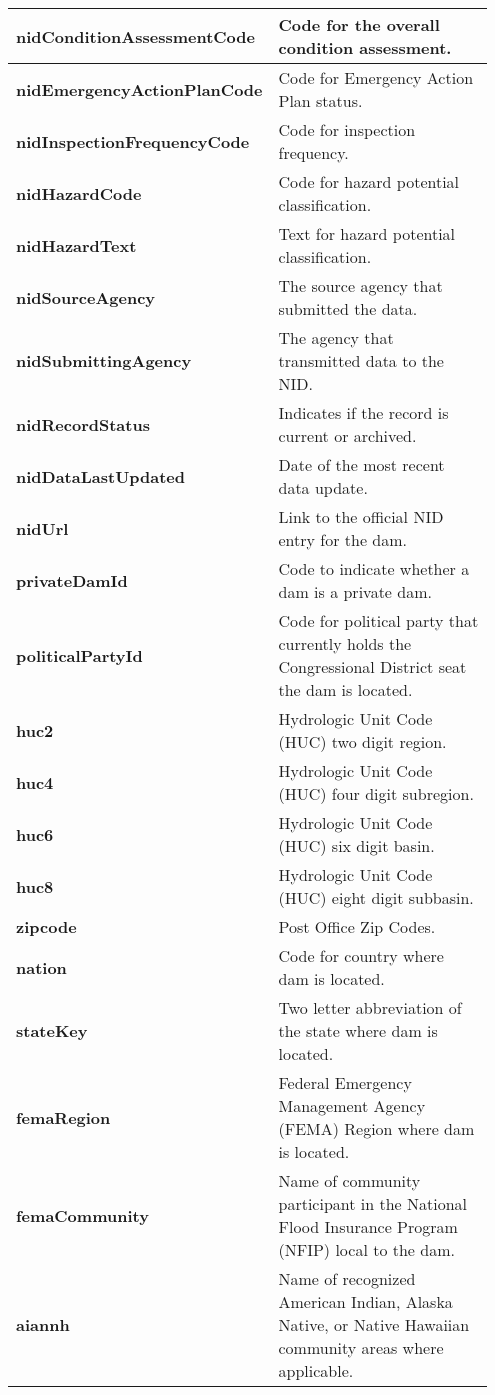 \documentclass{article}
\begin{document}
\begin{longtable}{p{0.35\linewidth} p{0.6\linewidth}}
\textbf{nidConditionAssessmentCode} & Code for the overall condition assessment. \\\hline
\textbf{nidEmergencyActionPlanCode} & Code for Emergency Action Plan status. \\\hline
\textbf{nidInspectionFrequencyCode} & Code for inspection frequency. \\\hline
\textbf{nidHazardCode} & Code for hazard potential classification. \\\hline
\textbf{nidHazardText} & Text for hazard potential classification. \\\hline
\textbf{nidSourceAgency} & The source agency that submitted the data. \\\hline
\textbf{nidSubmittingAgency} & The agency that transmitted data to the NID. \\\hline
\textbf{nidRecordStatus} & Indicates if the record is current or archived. \\\hline
\textbf{nidDataLastUpdated} & Date of the most recent data update. \\\hline
\textbf{nidUrl} & Link to the official NID entry for the dam. \\\hline
\textbf{privateDamId} & Code to indicate whether a dam is a private dam. \\\hline
\textbf{politicalPartyId} & Code for political party that currently holds the Congressional District seat the dam is located. \\\hline
\textbf{huc2} & Hydrologic Unit Code (HUC) two digit region. \\\hline
\textbf{huc4} & Hydrologic Unit Code (HUC) four digit subregion. \\\hline
\textbf{huc6} & Hydrologic Unit Code (HUC) six digit basin. \\\hline
\textbf{huc8} & Hydrologic Unit Code (HUC) eight digit subbasin. \\\hline
\textbf{zipcode} & Post Office Zip Codes. \\\hline
\textbf{nation} & Code for country where dam is located. \\\hline
\textbf{stateKey} & Two letter abbreviation of the state where dam is located. \\\hline
\textbf{femaRegion} & Federal Emergency Management Agency (FEMA) Region where dam is located. \\\hline
\textbf{femaCommunity} & Name of community participant in the National Flood Insurance Program (NFIP) local to the dam. \\\hline
\textbf{aiannh} & Name of recognized American Indian, Alaska Native, or Native Hawaiian community areas where applicable. \\\hline
\end{longtable}
\end{document}
